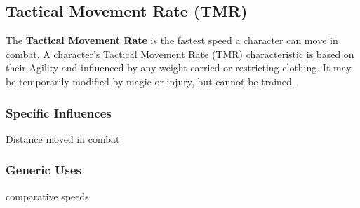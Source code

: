 \begin{multicols*}{3}
\subsection{Tactical Movement Rate (TMR)}

The \textbf{Tactical Movement Rate} is the fastest speed a character
can move in combat.  A character's Tactical Movement Rate (TMR)
characteristic is based on their Agility and influenced by any weight
carried or restricting clothing.  It may be temporarily modified by
magic or injury, but cannot be trained.
\subsubsection{Specific Influences}
\begin{Itemize}
\item Distance moved in combat
\end{Itemize}
\subsubsection{Generic Uses}
\begin{Itemize}
\item comparative speeds
\end{Itemize}
\end{multicols*}

\pagebreak


